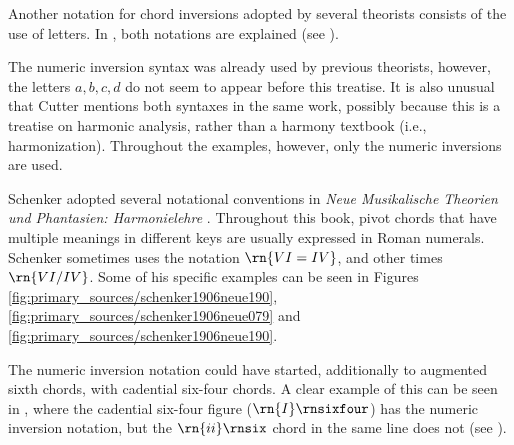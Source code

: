 
Another notation for chord inversions adopted by several
theorists consists of the use of letters. In
\textcite{cutter1902harmonic}, both notations are explained
(see
).


The numeric inversion syntax was already used by previous
theorists, however, the letters ${a, b, c , d}$ do not seem
to appear before this treatise. It is also unusual that
Cutter mentions both syntaxes in the same work, possibly
because this is a treatise on harmonic analysis, rather than
a harmony textbook (i.e., harmonization). Throughout the
examples, however, only the numeric inversions are used.

Schenker adopted several notational conventions in
\emph{Neue Musikalische Theorien und Phantasien:
Harmonielehre} \parencite{schenker1906neue}. Throughout this
book, pivot chords that have multiple meanings in different
keys are usually expressed in Roman numerals. Schenker
sometimes uses the notation $\rn{VI=IV}$, and other times
$\rn{VI/IV}$. Some of his specific examples can be seen in
Figures \ref{fig:primary_sources/schenker1906neue190},
\ref{fig:primary_sources/schenker1906neue079} and
\ref{fig:primary_sources/schenker1906neue190}.




The numeric inversion notation could have started,
additionally to augmented sixth chords, with cadential
six-four chords. A clear example of this can be seen in
\textcite{loewengard1908lehrbuch}, where the cadential
six-four figure ($\rn{I}\rnsixfour$) has the numeric
inversion notation, but the $\rn{ii}\rnsix$ chord in the
same line does not (see
).


